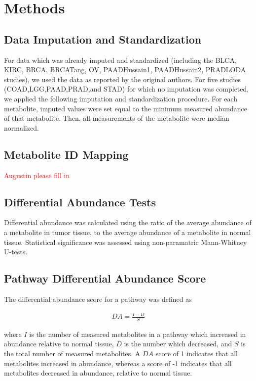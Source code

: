 \documentclass[10pt]{article}
\begin{document}
\section{Methods}

\subsection{Data Imputation and Standardization}
For data which was already imputed and standardized (including the BLCA, KIRC, BRCA, BRCATang, OV, PAADHussain1, PAADHussain2, PRADLODA studies), we used the data as reported by the original authors. For five studies (COAD,LGG,PAAD,PRAD,and STAD) for which no imputation was completed, we applied the following imputation and standardization procedure. For each metabolite, imputed values were set equal to the minimum measured abundance of that metabolite. Then, all measurements of the metabolite were median normalized. 

\subsection{Metabolite ID Mapping}
\textcolor{red}{Augustin please fill in}

\subsection{Differential Abundance Tests}
Differential abundance was calculated using the ratio of the average abundance of a metabolite in tumor tissue, to the average abundance of a metabolite in normal tissue. Statistical significance was assessed using non-paramatric Mann-Whitney U-tests.

\subsection{Pathway Differential Abundance Score}
The differential abundance score for a pathway was defined as

\begin{align*}
DA = \frac{I - D}{S}
\end{align*}

\noindent where $I$ is the number of measured metabolites in a pathway which increased in abundance relative to normal tissue, $D$ is the number which decreased, and $S$ is the total number of measured metabolites. A $DA$ score of 1 indicates that all metabolites increased in abundance, whereas a score of -1 indicates that all metabolites decreased in abundance, relative to normal tissue.
\end{document}
